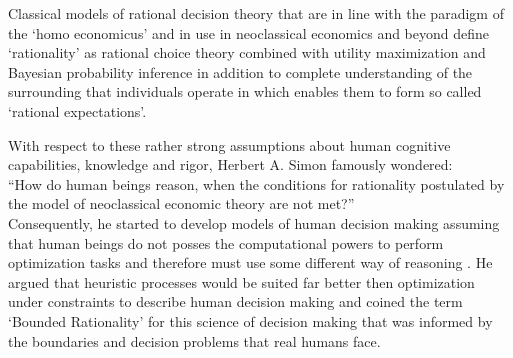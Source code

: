 
Classical models of rational decision theory that are in line with the paradigm of the `homo economicus' and in use in neoclassical economics and beyond define `rationality' as rational choice theory combined with utility maximization and Bayesian probability inference \citep{wilkinson2012introduction} in addition to complete understanding of the surrounding that individuals operate in which enables them to form so called `rational expectations'. 

With respect to these rather strong assumptions about human cognitive capabilities, knowledge and rigor, Herbert A. Simon famously wondered: \\

``How do human beings reason, when the conditions for rationality postulated by the model of neoclassical economic theory are not met?''  \citep{simon1989scientist}\\

Consequently, he started to develop models of human decision making assuming that human beings do not posses the computational powers to perform optimization tasks and therefore must use some different way of reasoning \citep{simon1982models}. He argued that heuristic processes would be suited far better then optimization under constraints to describe human decision making and coined the term `Bounded Rationality' for this science of decision making that was informed by the boundaries and decision problems that real humans face.\\

